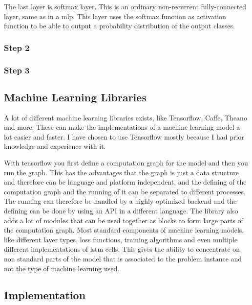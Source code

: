 The last layer is softmax layer. This is an ordinary non-recurrent fully-connected layer, same as in 
a \gls{mlp}. This layer uses the softmax function as activation function to be able to output 
a probability distribution of the output classes.
 
\subsubsection{Step 2}

\subsubsection{Step 3}

\subsection{Machine Learning Libraries}
A lot of different machine learning libraries exists, like Tensorflow\cite{tensorflow}, Caffe\cite{caffe}, 
Theano\cite{theano} and more. These can make the implementations of a machine learning model a lot easier 
and faster. I have chosen to use Tensorflow mostly because I had prior knowledge and experience with it.

With tensorflow you first define a computation graph for the model and then you run the graph.
This has the advantages that the graph is just a data structure and therefore can be language and platform 
independent, and the defining of the computation graph and the running of it can be separated to different 
processes. The running can therefore be handled by a highly optimized backend and the defining can be done 
by using an API in a different language.
The library also adds a lot of modules that can be used together as blocks to form large parts of the 
computation graph. Most standard components of machine learning models, like different layer types, 
loss functions, training algorithms and even multiple different implementations of \gls{lstm} cells.
This gives the ability to concentrate on non standard parts of the model that is associated to the 
problem instance and not the type of machine learning used.

\subsection{Implementation}

